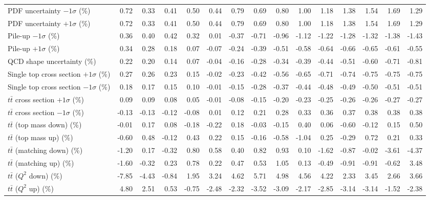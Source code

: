 \begin{table}[htbp]
{\begin{tabular}{lrrrrrrrrrrrrrr}
PDF uncertainty $-1\sigma$ (\%) & 0.72 & 0.33 & 0.41 & 0.50 & 0.44 & 0.79 & 0.69 & 0.80 & 1.00 & 1.18 & 1.38 & 1.54 & 1.69 & 1.29 \\ 
PDF uncertainty $+1\sigma$ (\%) & 0.72 & 0.33 & 0.41 & 0.50 & 0.44 & 0.79 & 0.69 & 0.80 & 1.00 & 1.18 & 1.38 & 1.54 & 1.69 & 1.29 \\ 
Pile-up $-1\sigma$ (\%) & 0.36 & 0.40 & 0.42 & 0.32 & 0.01 & -0.37 & -0.71 & -0.96 & -1.12 & -1.22 & -1.28 & -1.32 & -1.38 & -1.43 \\ 
Pile-up $+1\sigma$ (\%) & 0.34 & 0.28 & 0.18 & 0.07 & -0.07 & -0.24 & -0.39 & -0.51 & -0.58 & -0.64 & -0.66 & -0.65 & -0.61 & -0.55 \\ 
QCD shape uncertainty (\%) & 0.22 & 0.20 & 0.14 & 0.07 & -0.04 & -0.16 & -0.28 & -0.34 & -0.39 & -0.44 & -0.51 & -0.60 & -0.71 & -0.81 \\ 
Single top cross section $+1\sigma$ (\%) & 0.27 & 0.26 & 0.23 & 0.15 & -0.02 & -0.23 & -0.42 & -0.56 & -0.65 & -0.71 & -0.74 & -0.75 & -0.75 & -0.75 \\ 
Single top cross section $-1\sigma$ (\%) & 0.18 & 0.17 & 0.15 & 0.10 & -0.01 & -0.15 & -0.28 & -0.37 & -0.44 & -0.48 & -0.49 & -0.50 & -0.51 & -0.51 \\ 
$t\bar{t}$ cross section $+1\sigma$ (\%) & 0.09 & 0.09 & 0.08 & 0.05 & -0.01 & -0.08 & -0.15 & -0.20 & -0.23 & -0.25 & -0.26 & -0.26 & -0.27 & -0.27 \\ 
$t\bar{t}$ cross section $-1\sigma$ (\%) & -0.13 & -0.13 & -0.12 & -0.08 & 0.01 & 0.12 & 0.21 & 0.28 & 0.33 & 0.36 & 0.37 & 0.38 & 0.38 & 0.38 \\ 
$t\bar{t}$ (top mass down) (\%) & -0.01 & 0.17 & 0.08 & -0.18 & -0.22 & 0.18 & -0.03 & -0.15 & 0.40 & 0.06 & -0.60 & -0.12 & 0.15 & 0.50 \\ 
$t\bar{t}$ (top mass up) (\%) & -0.60 & 0.48 & -0.12 & 0.43 & 0.22 & 0.15 & -0.16 & -0.58 & -1.04 & 0.25 & -0.29 & 0.72 & 0.21 & 0.33 \\ 
$t\bar{t}$ (matching down) (\%) & -1.20 & 0.17 & -0.32 & 0.80 & 0.58 & 0.40 & 0.82 & 0.93 & 0.10 & -1.62 & -0.87 & -0.02 & -3.61 & -4.37 \\ 
$t\bar{t}$ (matching up) (\%) & -1.60 & -0.32 & 0.23 & 0.78 & 0.22 & 0.47 & 0.53 & 1.05 & 0.13 & -0.49 & -0.91 & -0.91 & -0.62 & 3.48 \\ 
$t\bar{t}$ ($Q^{2}$ down) (\%) & -7.85 & -4.43 & -0.84 & 1.95 & 3.24 & 4.62 & 5.71 & 4.98 & 4.56 & 4.22 & 2.33 & 3.45 & 2.66 & 3.66 \\ 
$t\bar{t}$ ($Q^{2}$ up) (\%) & 4.80 & 2.51 & 0.53 & -0.75 & -2.48 & -2.32 & -3.52 & -3.09 & -2.17 & -2.85 & -3.14 & -3.14 & -1.52 & -2.38 \\ 

\end{tabular}}
\end{table}
